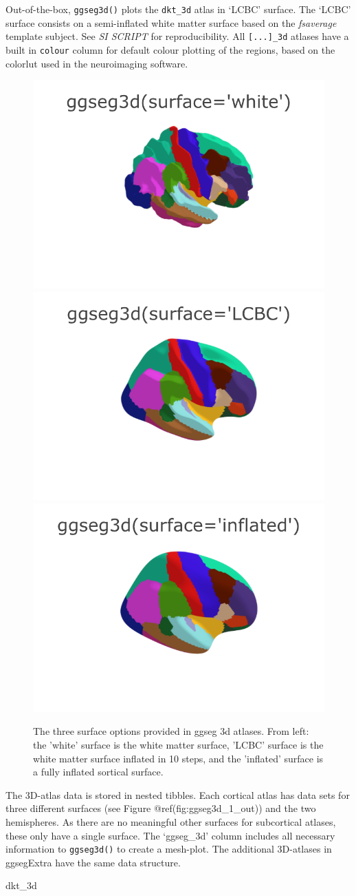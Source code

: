 \documentclass[fleqn,10pt]{wlpeerj} %
\newenvironment{Shaded}{\begin{snugshade}}{\end{snugshade}}
\newcommand{\NormalTok}[1]{#1}
\begin{document}
Out-of-the-box, \texttt{ggseg3d()} plots the \texttt{dkt\_3d} atlas in `LCBC' surface.
The `LCBC' surface consists on a semi-inflated white matter surface based on the \emph{fsaverage} template subject.
See \emph{SI SCRIPT} for reproducibility.
All \texttt{{[}...{]}\_3d} atlases have a built in \texttt{colour} column for default colour plotting of the regions, based on the colorlut used in the neuroimaging software.

\begin{figure}
\includegraphics[width=0.3\linewidth]{png/ggseg3d_white} \includegraphics[width=0.3\linewidth]{png/ggseg3d} \includegraphics[width=0.3\linewidth]{png/ggseg3d_inflated} \caption{The three surface options provided in ggseg 3d atlases. From left: the 'white' surface is the white matter surface, 'LCBC' surface is the white matter surface inflated in 10 steps, and the 'inflated' surface is a fully inflated sortical surface.}\label{fig:ggseg3d-1-out}
\end{figure}

The 3D-atlas data is stored in nested tibbles.
Each cortical atlas has data sets for three different surfaces (see Figure @ref(fig:ggseg3d\_1\_out)) and the two hemispheres.
As there are no meaningful other surfaces for subcortical atlases, these only have a single surface.
The `ggseg\_3d' column includes all necessary information to \texttt{ggseg3d()} to create a mesh-plot.
The additional 3D-atlases in ggsegExtra have the same data structure.

\small

\begin{Shaded}
\begin{Highlighting}[]
\NormalTok{dkt_3d}
\end{Highlighting}
\end{Shaded}
\end{document}
